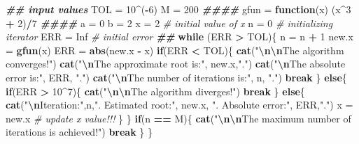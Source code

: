 \documentclass[
]{book}
\newenvironment{Shaded}{\begin{snugshade}}{\end{snugshade}}
\newcommand{\CommentTok}[1]{\textcolor[rgb]{0.56,0.35,0.01}{\textit{#1}}}
\newcommand{\ConstantTok}[1]{\textcolor[rgb]{0.56,0.35,0.01}{#1}}
\newcommand{\ControlFlowTok}[1]{\textcolor[rgb]{0.13,0.29,0.53}{\textbf{#1}}}
\newcommand{\DecValTok}[1]{\textcolor[rgb]{0.00,0.00,0.81}{#1}}
\newcommand{\DocumentationTok}[1]{\textcolor[rgb]{0.56,0.35,0.01}{\textbf{\textit{#1}}}}
\newcommand{\FunctionTok}[1]{\textcolor[rgb]{0.13,0.29,0.53}{\textbf{#1}}}
\newcommand{\NormalTok}[1]{#1}
\newcommand{\OtherTok}[1]{\textcolor[rgb]{0.56,0.35,0.01}{#1}}
\newcommand{\SpecialCharTok}[1]{\textcolor[rgb]{0.81,0.36,0.00}{\textbf{#1}}}
\newcommand{\StringTok}[1]{\textcolor[rgb]{0.31,0.60,0.02}{#1}}
\begin{document}
\begin{Shaded}
\begin{Highlighting}[]
\DocumentationTok{\#\# input values}
\NormalTok{TOL }\OtherTok{=} \DecValTok{10}\SpecialCharTok{\^{}}\NormalTok{(}\SpecialCharTok{{-}}\DecValTok{6}\NormalTok{)}
\NormalTok{  M }\OtherTok{=} \DecValTok{200}
\DocumentationTok{\#\#\#\#}
\NormalTok{gfun }\OtherTok{=} \ControlFlowTok{function}\NormalTok{(x) (x}\SpecialCharTok{\^{}}\DecValTok{3} \SpecialCharTok{+} \DecValTok{2}\NormalTok{)}\SpecialCharTok{/}\DecValTok{7}
\DocumentationTok{\#\#\#\#}
\NormalTok{ a }\OtherTok{=} \DecValTok{0}
\NormalTok{ b }\OtherTok{=} \DecValTok{2}
\NormalTok{ x }\OtherTok{=} \DecValTok{2}       \CommentTok{\# initial value of x}
\NormalTok{ n }\OtherTok{=} \DecValTok{0}        \CommentTok{\# initializing iterator}
\NormalTok{ ERR }\OtherTok{=} \ConstantTok{Inf}    \CommentTok{\# initial error}
\DocumentationTok{\#\# }
 \ControlFlowTok{while}\NormalTok{ (ERR }\SpecialCharTok{\textgreater{}}\NormalTok{ TOL)\{}
\NormalTok{  n }\OtherTok{=}\NormalTok{ n }\SpecialCharTok{+} \DecValTok{1}
\NormalTok{  new.x }\OtherTok{=} \FunctionTok{gfun}\NormalTok{(x)}
\NormalTok{  ERR }\OtherTok{=} \FunctionTok{abs}\NormalTok{(new.x }\SpecialCharTok{{-}}\NormalTok{ x)}
  \ControlFlowTok{if}\NormalTok{(ERR }\SpecialCharTok{\textless{}}\NormalTok{ TOL)\{}
    \FunctionTok{cat}\NormalTok{(}\StringTok{"}\SpecialCharTok{\textbackslash{}n\textbackslash{}n}\StringTok{The algorithm converges!"}\NormalTok{)}
    \FunctionTok{cat}\NormalTok{(}\StringTok{"}\SpecialCharTok{\textbackslash{}n}\StringTok{The approximate root is:"}\NormalTok{, new.x,}\StringTok{"."}\NormalTok{)}
    \FunctionTok{cat}\NormalTok{(}\StringTok{"}\SpecialCharTok{\textbackslash{}n}\StringTok{The absolute error is:"}\NormalTok{, ERR, }\StringTok{"."}\NormalTok{)}
    \FunctionTok{cat}\NormalTok{(}\StringTok{"}\SpecialCharTok{\textbackslash{}n}\StringTok{The number of iterations is:"}\NormalTok{, n, }\StringTok{"."}\NormalTok{)}
    \ControlFlowTok{break}
\NormalTok{  \} }\ControlFlowTok{else}\NormalTok{\{}
    \ControlFlowTok{if}\NormalTok{(ERR }\SpecialCharTok{\textgreater{}} \DecValTok{10}\SpecialCharTok{\^{}}\DecValTok{7}\NormalTok{)\{}
        \FunctionTok{cat}\NormalTok{(}\StringTok{"}\SpecialCharTok{\textbackslash{}n\textbackslash{}n}\StringTok{The algorithm diverges!"}\NormalTok{)}
        \ControlFlowTok{break}
\NormalTok{    \} }\ControlFlowTok{else}\NormalTok{\{}
         \FunctionTok{cat}\NormalTok{(}\StringTok{"}\SpecialCharTok{\textbackslash{}n}\StringTok{Iteration:"}\NormalTok{,n,}\StringTok{". Estimated root:"}\NormalTok{, new.x, }\StringTok{". Absolute error:"}\NormalTok{, ERR,}\StringTok{"."}\NormalTok{)}
\NormalTok{         x }\OtherTok{=}\NormalTok{ new.x              }\CommentTok{\# update x value!!!}
\NormalTok{    \}}
\NormalTok{  \}}
  \ControlFlowTok{if}\NormalTok{(n }\SpecialCharTok{==}\NormalTok{ M)\{}
    \FunctionTok{cat}\NormalTok{(}\StringTok{"}\SpecialCharTok{\textbackslash{}n\textbackslash{}n}\StringTok{The maximum number of iterations is achieved!"}\NormalTok{)}
    \ControlFlowTok{break}
\NormalTok{  \} }
\NormalTok{ \}}
\end{Highlighting}
\end{Shaded}
\end{document}
